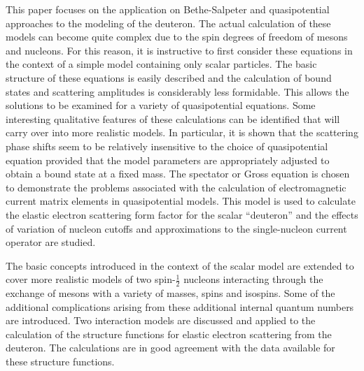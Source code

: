 \documentclass[mythesis.tex]{subfiles}
\begin{document}
This paper focuses on the application on Bethe-Salpeter and quasipotential
approaches to the modeling of the deuteron. The actual calculation of these
models can become quite complex due to the spin degrees of freedom of
mesons and nucleons. For this reason, it is instructive to first consider
these equations in the context of a simple model containing only scalar
particles. The basic structure of these equations is easily described
and the calculation of bound states and scattering amplitudes is
considerably less formidable. This allows the solutions to be examined
for a variety of quasipotential equations. Some interesting qualitative
features of these calculations can be identified that will carry over into
more realistic models. In particular, it is shown that the scattering phase
shifts seem to be relatively insensitive to the choice of quasipotential
equation provided that the model parameters are appropriately adjusted to
obtain a bound state at a fixed mass.
The spectator or Gross equation is chosen to
demonstrate the problems associated with the calculation of electromagnetic
current matrix elements in quasipotential models. This model is used to
calculate the elastic electron scattering form factor for the scalar
``deuteron'' and the effects of variation of nucleon cutoffs and
approximations to the single-nucleon current operator are studied.

The basic concepts introduced in the context of the scalar model are
extended to cover  more realistic models of two spin-$\frac{1}{2}$ nucleons
interacting through the exchange of mesons with a variety of masses,
spins and isospins. Some of the additional complications arising from
these additional internal quantum numbers are introduced. Two interaction
models are discussed and applied to the calculation of the structure
functions for elastic electron scattering from the deuteron. The
calculations are in good agreement with the data available for these
structure functions.
\end{document}
